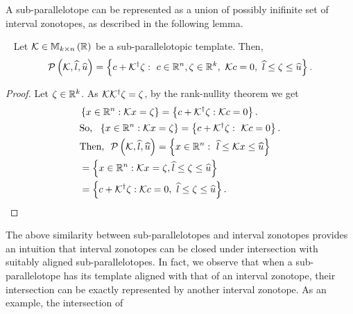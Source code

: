 A sub-parallelotope can be represented as a union of possibly inifinite set of interval zonotopes, as described in the following lemma.
%
\begin{lemma}~\label{lem:ptope-iz-conversion}
  Let $\mathcal{K}\in\mathbb{M}_{k\times n}\left(\mathbb{R}\right)$ be a sub-parallelotopic template.
  Then,
  \[
  \mathcal{P}\left(\mathcal{K},\widehat{l},\widehat{u}\right)=\left\{c+{\mathcal{K}}^\dagger\zeta:~c\in\mathbb{R}^n,\zeta\in\mathbb{R}^k,~\mathcal{K}
  c=0,~\widehat{l}\leq
  \zeta\leq \widehat{u}
  \right\}.
  \]
%
\end{lemma}
%
\begin{proof}
Let $\zeta\in\mathbb{R}^k$.  As $\mathcal{K}{{\mathcal{K}}^\dagger\zeta}=\zeta$,
by the rank-nullity theorem we get
%
\begin{align*}
& \left\{x\in\mathbb{R}^n:\mathcal{K} x=\zeta\right\}=\left\{c+{\mathcal{K}}^\dagger\zeta:\mathcal{K} c=0\right\}.\\
& \text{So,}~~\left\{x\in\mathbb{R}^n:\mathcal{K} x=\zeta\right\}=\left\{c+{\mathcal{K}}^\dagger\zeta:~\mathcal{K} c=0\right\}.\\
& \text{Then,} ~~\mathcal{P}\left(\mathcal{K},\widehat{l},\widehat{u}\right) = \left\{x\in\mathbb{R}^n:~\widehat{l}\leq \mathcal{K} x\leq\widehat{u}\right\}\nonumber\\
& = \left\{x\in\mathbb{R}^n:\mathcal{K}
  x=\zeta, \widehat{l}\leq \zeta\leq\widehat{u}\right\}\nonumber\\
& = \left\{c+{\mathcal{K}}^\dagger\zeta:\mathcal{K} c=0,~\widehat{l}\leq\zeta\leq\widehat{u}\right\}.\hspace{5em}\qedhere
\end{align*}
%
\end{proof}
%
The above similarity between sub-parallelotopes and interval
zonotopes provides an intuition that interval zonotopes can be
closed under intersection with suitably aligned
sub-parallelotopes.  In fact, we observe that when a
sub-parallelotope has its template aligned with that of an interval
zonotope, their intersection can be exactly represented by another
interval zonotope.  As an example, the intersection of
%
